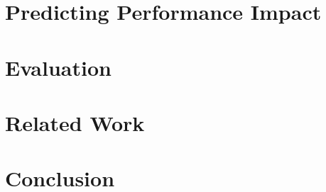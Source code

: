 \documentclass{sig-alternate}
\begin{document}
\section{Predicting Performance Impact}


%

%

\section{Evaluation}


%

\section{Related Work}



\section{Conclusion}



{
%
%
}
\end{document}
